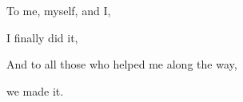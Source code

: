 
\begin{center}
\vspace*{42pt}
\singlespacing
To me, myself, and I,

I finally did it,

\doublespacing
\singlespacing

And to all those who helped me along the way,
    
we made it.
\end{center}

\pagebreak
